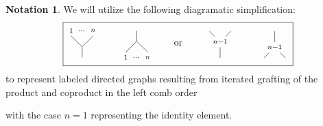 \documentclass{amsart}
\theoremstyle{definition}
\newtheorem{notation}[theorem]{Notation}
\begin{document}
	\begin{notation} \label{notation: higher valence}
		We will utilize the following diagramatic simplification:
		\begin{equation*}
			\boxed{\begin{tikzpicture}[scale=.4]
				\draw (6,2)--(7,1)--(7,0);
				\draw (8,2)--(7,1);
				\node at (6,2.5){$\scriptstyle 1$};
				\node at (7,2.5){$\scriptstyle \dots$};
				\node at (8,2.5){$\scriptstyle n$};
				
				\draw (11,.5)--(12,1.5)--(12,2.5);
				\draw (13,.5)--(12,1.5);
				\node at (11,0){$\scriptstyle 1$};
				\node at (12,0){$\scriptstyle \dots$};
				\node at (13,0){$\scriptstyle n$};
				\end{tikzpicture}
				\begin{tikzpicture}[scale=.4]
				\node at (-1,2.5){};
				\node at (1,1.5){or};
				\node at (1,0){};
				\end{tikzpicture}\qquad 
				\begin{tikzpicture}[scale=.4]		
				\draw (12.5,2.5)--(13,2);
				\draw (14.5,2.5)--(14,2);
				\node at (13.5,1.5){$\scriptstyle n-1$};
				\draw (13.5,1)--(13.5,0);
				
				\draw (17.5,0)--(18,.5);
				\draw (19.5,0)--(19,.5);
				\node at (18.5,1){$\scriptstyle n-1$};
				\draw (18.5,1.5)--(18.5,2.5);
				
				\node at (19.6,-.15){};
				\node at (12.4,2.65){};
				\end{tikzpicture}}
		\end{equation*}
		to represent labeled directed graphs resulting from iterated grafting of the product and coproduct in the left comb order
		\begin{center}
		\end{center}
		with the case $n=1$ representing the identity element.
	\end{notation}	
	
\end{document}
